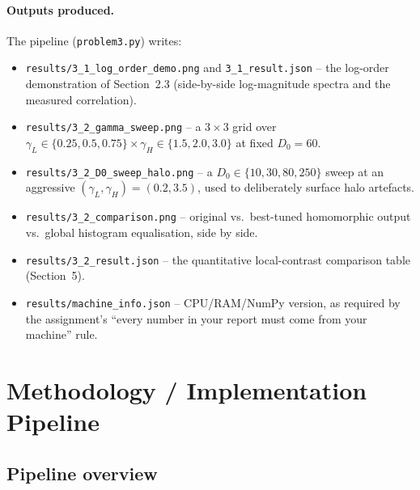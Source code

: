 \documentclass[11pt]{article}
\begin{document}
\paragraph{Outputs produced.} The pipeline (\texttt{problem3.py}) writes:
\begin{itemize}[leftmargin=1.5em]
  \item \texttt{results/3\_1\_log\_order\_demo.png} and \texttt{3\_1\_result.json} --
  the log-order demonstration of Section~2.3 (side-by-side log-magnitude spectra and the
  measured correlation).
  \item \texttt{results/3\_2\_gamma\_sweep.png} -- a $3\times3$ grid over
  $\gamma_L\in\{0.25,0.5,0.75\}\times\gamma_H\in\{1.5,2.0,3.0\}$ at fixed $D_0=60$.
  \item \texttt{results/3\_2\_D0\_sweep\_halo.png} -- a $D_0\in\{10,30,80,250\}$ sweep at
  an aggressive $(\gamma_L,\gamma_H)=(0.2,3.5)$, used to deliberately surface halo
  artefacts.
  \item \texttt{results/3\_2\_comparison.png} -- original vs.\ best-tuned homomorphic
  output vs.\ global histogram equalisation, side by side.
  \item \texttt{results/3\_2\_result.json} -- the quantitative local-contrast comparison
  table (Section~5).
  \item \texttt{results/machine\_info.json} -- CPU/RAM/NumPy version, as required by the
  assignment's ``every number in your report must come from your machine'' rule.
\end{itemize}

\section{Methodology / Implementation Pipeline}

\subsection{Pipeline overview}
\end{document}

